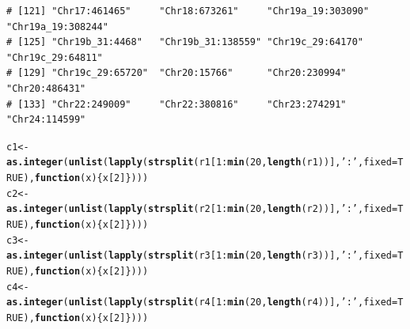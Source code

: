 \documentclass{article}\usepackage[]{graphicx}\usepackage[]{color}
\makeatletter
\newcommand{\hlnum}[1]{\textcolor[rgb]{0.686,0.059,0.569}{#1}}%
\newcommand{\hlstr}[1]{\textcolor[rgb]{0.192,0.494,0.8}{#1}}%
\newcommand{\hlopt}[1]{\textcolor[rgb]{0,0,0}{#1}}%
\newcommand{\hlstd}[1]{\textcolor[rgb]{0.345,0.345,0.345}{#1}}%
\newcommand{\hlkwa}[1]{\textcolor[rgb]{0.161,0.373,0.58}{\textbf{#1}}}%
\newcommand{\hlkwb}[1]{\textcolor[rgb]{0.69,0.353,0.396}{#1}}%
\newcommand{\hlkwc}[1]{\textcolor[rgb]{0.333,0.667,0.333}{#1}}%
\newcommand{\hlkwd}[1]{\textcolor[rgb]{0.737,0.353,0.396}{\textbf{#1}}}%
\newenvironment{kframe}{%
 \def\at@end@of@kframe{}%
 \ifinner\ifhmode%
  \def\at@end@of@kframe{\end{minipage}}%
  \begin{minipage}{\columnwidth}%
 \fi\fi%
 \def\FrameCommand##1{\hskip\@totalleftmargin \hskip-\fboxsep
 \colorbox{shadecolor}{##1}\hskip-\fboxsep
     \hskip-\linewidth \hskip-\@totalleftmargin \hskip\columnwidth}%
 \MakeFramed {\advance\hsize-\width
   \@totalleftmargin\z@ \linewidth\hsize
   \@setminipage}}%
 {\par\unskip\endMakeFramed%
 \at@end@of@kframe}
\newenvironment{knitrout}{}{} %
\makeatother
\begin{document}
\begin{knitrout}
\begin{kframe}
\begin{verbatim}
# [121] "Chr17:461465"     "Chr18:673261"     "Chr19a_19:303090" "Chr19a_19:308244"
# [125] "Chr19b_31:4468"   "Chr19b_31:138559" "Chr19c_29:64170"  "Chr19c_29:64811" 
# [129] "Chr19c_29:65720"  "Chr20:15766"      "Chr20:230994"     "Chr20:486431"    
# [133] "Chr22:249009"     "Chr22:380816"     "Chr23:274291"     "Chr24:114599"
\end{verbatim}
\begin{alltt}
\hlstd{c1} \hlkwb{<-} \hlkwd{as.integer}\hlstd{(}\hlkwd{unlist}\hlstd{(}\hlkwd{lapply}\hlstd{(}\hlkwd{strsplit}\hlstd{(r1[}\hlnum{1}\hlopt{:}\hlkwd{min}\hlstd{(}\hlnum{20}\hlstd{,}\hlkwd{length}\hlstd{(r1))],}\hlstr{':'}\hlstd{,}\hlkwc{fixed}\hlstd{=}\hlnum{TRUE}\hlstd{),}\hlkwa{function}\hlstd{(}\hlkwc{x}\hlstd{)\{x[}\hlnum{2}\hlstd{]\})))}
\hlstd{c2} \hlkwb{<-} \hlkwd{as.integer}\hlstd{(}\hlkwd{unlist}\hlstd{(}\hlkwd{lapply}\hlstd{(}\hlkwd{strsplit}\hlstd{(r2[}\hlnum{1}\hlopt{:}\hlkwd{min}\hlstd{(}\hlnum{20}\hlstd{,}\hlkwd{length}\hlstd{(r2))],}\hlstr{':'}\hlstd{,}\hlkwc{fixed}\hlstd{=}\hlnum{TRUE}\hlstd{),}\hlkwa{function}\hlstd{(}\hlkwc{x}\hlstd{)\{x[}\hlnum{2}\hlstd{]\})))}
\hlstd{c3} \hlkwb{<-} \hlkwd{as.integer}\hlstd{(}\hlkwd{unlist}\hlstd{(}\hlkwd{lapply}\hlstd{(}\hlkwd{strsplit}\hlstd{(r3[}\hlnum{1}\hlopt{:}\hlkwd{min}\hlstd{(}\hlnum{20}\hlstd{,}\hlkwd{length}\hlstd{(r3))],}\hlstr{':'}\hlstd{,}\hlkwc{fixed}\hlstd{=}\hlnum{TRUE}\hlstd{),}\hlkwa{function}\hlstd{(}\hlkwc{x}\hlstd{)\{x[}\hlnum{2}\hlstd{]\})))}
\hlstd{c4} \hlkwb{<-} \hlkwd{as.integer}\hlstd{(}\hlkwd{unlist}\hlstd{(}\hlkwd{lapply}\hlstd{(}\hlkwd{strsplit}\hlstd{(r4[}\hlnum{1}\hlopt{:}\hlkwd{min}\hlstd{(}\hlnum{20}\hlstd{,}\hlkwd{length}\hlstd{(r4))],}\hlstr{':'}\hlstd{,}\hlkwc{fixed}\hlstd{=}\hlnum{TRUE}\hlstd{),}\hlkwa{function}\hlstd{(}\hlkwc{x}\hlstd{)\{x[}\hlnum{2}\hlstd{]\})))}


\end{alltt}
\end{kframe}
\end{knitrout}
\end{document}
